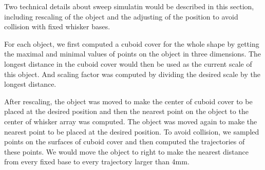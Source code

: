 Two technical details about sweep simulatin would be described in this section, including rescaling of the object and the adjusting of the position to avoid collision with fixed whisker bases.

For each object, we first computed a cuboid cover for the whole shape by getting the maximal and minimal values of points on the object in three dimensions. 
The longest distance in the cuboid cover would then be used as the current scale of this object. 
And scaling factor was computed by dividing the desired scale by the longest distance. 

After rescaling, the object was moved to make the center of cuboid cover to be placed at the desired position and then the nearest point on the object to the center of whisker array was computed.
The object was moved again to make the nearest point to be placed at the desired position.
To avoid collision, we sampled points on the surfaces of cuboid cover and then computed the trajectories of these points. 
We would move the object to right to make the nearest distance from every fixed base to every trajectory larger than 4mm.

